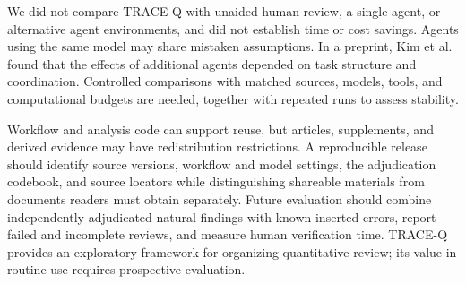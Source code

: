 We did not compare TRACE-Q with unaided human review, a single agent, or alternative agent environments, and did not establish time or cost savings. Agents using the same model may share mistaken assumptions. In a preprint, Kim et al. found that the effects of additional agents depended on task structure and coordination.\cite{kim2026scaling} Controlled comparisons with matched sources, models, tools, and computational budgets are needed, together with repeated runs to assess stability.

Workflow and analysis code can support reuse, but articles, supplements, and derived evidence may have redistribution restrictions. A reproducible release should identify source versions, workflow and model settings, the adjudication codebook, and source locators while distinguishing shareable materials from documents readers must obtain separately. Future evaluation should combine independently adjudicated natural findings with known inserted errors, report failed and incomplete reviews, and measure human verification time. TRACE-Q provides an exploratory framework for organizing quantitative review; its value in routine use requires prospective evaluation.
